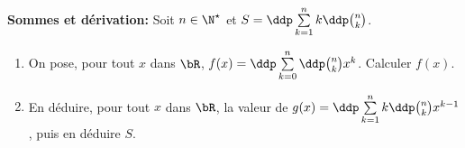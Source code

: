 
\begin{exercice}  \;  \textbf{Sommes et d\'erivation:} 
Soit $n\in\N^{\star}$ et $S=\ddp \sum\limits_{k=1}^n k\ddp \binom{n}{k}$. %
\begin{enumerate}
\item
On pose, pour tout $x$ dans $\bR$, $f(x)=\ddp \sum\limits_{k=0}^n \ddp \binom{n}{k}x^k$. Calculer $f(x)$.
\item 
En d\'eduire, pour tout $x$ dans $\bR$, la valeur de $g(x)=\ddp \sum\limits_{k=1}^n k\ddp \binom{n}{k}x^{k-1}$, puis en d\'eduire $S$.
\end{enumerate}
\end{exercice}